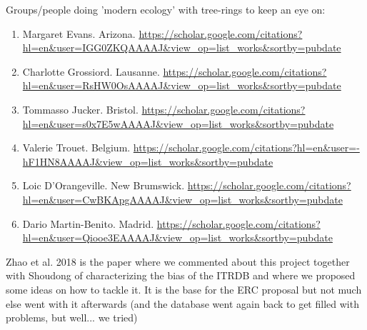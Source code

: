 \documentclass[11pt,letter]{article}
\begin{document}
\begin{enumerate}
Groups/people doing 'modern ecology' with tree-rings to keep an eye on:
\begin{enumerate}
\item Margaret Evans. Arizona. \url{https://scholar.google.com/citations?hl=en&user=IGG0ZKQAAAAJ&view_op=list_works&sortby=pubdate}
\item Charlotte Grossiord. Lausanne. \url{https://scholar.google.com/citations?hl=en&user=RsHW0OsAAAAJ&view_op=list_works&sortby=pubdate}
\item Tommasso Jucker. Bristol. \url{https://scholar.google.com/citations?hl=en&user=s0x7E5wAAAAJ&view_op=list_works&sortby=pubdate}
\item Valerie Trouet. Belgium. \url{https://scholar.google.com/citations?hl=en&user=-hF1HN8AAAAJ&view_op=list_works&sortby=pubdate}
\item Loic D'Orangeville. New Brumswick. \url{https://scholar.google.com/citations?hl=en&user=CwBKApgAAAAJ&view_op=list_works&sortby=pubdate}
\item Dario Martin-Benito. Madrid. \url{https://scholar.google.com/citations?hl=en&user=Qiooe3EAAAAJ&view_op=list_works&sortby=pubdate}
\end{enumerate}

Zhao et al. 2018 is the paper where we commented about this project together with Shoudong of characterizing the bias of the ITRDB and where we proposed some ideas on how to tackle it. It is the base for the ERC proposal but not much else went with it afterwards (and the database went again back to get filled with problems, but well... we tried)


\end{enumerate}
\end{document}
